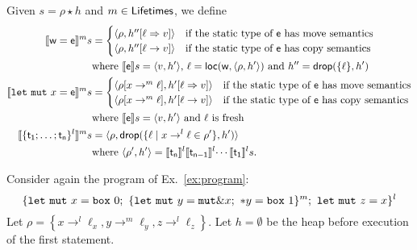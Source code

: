 \begin{definition}\label{def:semantics_terms}
  Given $s=\rho\star h$ and $m\in\Lifetimes$, we define
  \begin{align*}
    \denl[\mathsf{w}=\mathsf{e}]{m}{s}&=
    \begin{cases}
      \langle\rho,h''[\ell\Rightarrow v]\rangle & \text{if the static type of $\mathsf{e}$ has move semantics}\\
      \langle\rho,h''[\ell\to v]\rangle & \text{if the static type of $\mathsf{e}$ has copy semantics}
    \end{cases}\\
    &\text{where $\den[\mathsf{e}]{s}=\langle v,h'\rangle$, $\ell=\loc(\mathsf{w},\langle\rho,h'\rangle)$ and
      $h''=\drop(\{\ell\},h')$}\\
    \denl[\mathtt{let\ mut}\ x=\mathsf{e}]{m}{s}&=
    \begin{cases}
      \langle\rho[x\to^m\ell],h'[\ell\Rightarrow v]\rangle & \text{if the static type of $\mathsf{e}$ has move semantics}\\
      \langle\rho[x\to^m\ell],h'[\ell\to v]\rangle & \text{if the static type of $\mathsf{e}$ has copy semantics}
    \end{cases}\\
    &\text{where $\den[\mathsf{e}]{s}=\langle v,h'\rangle$ and $\ell$ is fresh}\\
    \denl[\{\mathsf{t_1};\ldots;\mathsf{t_n}\}^l]{m}{s}&=\langle\rho,\drop(\{\ell\mid x\to^l\ell\in\rho'\},h')\rangle\\
    &\text{where $\langle\rho',h'\rangle=\denl[\mathsf{t_n}]{l}{\denl[\mathsf{t_{n-1}}]{l}{\cdots\denl[\mathsf{t_1}]{l}{s}}}$.}
  \end{align*}
\end{definition}

\begin{example}
  Consider again the program of Ex.~\ref{ex:program}:
  \[
    \{
      \mathtt{let\ mut}\ x = \mathtt{box}\ 0;\
      \{\mathtt{let\ mut}\ y = \mathtt{mut}\borrow x;\
      \mathtt{*}y = \mathtt{box}\ 1\}^m;\
      \mathtt{let\ mut}\ z = x
    \}^l
  \]
  Let $\rho=\left\{x\rightarrow^l\ell_x,
  y\rightarrow^m\ell_y,
  z\rightarrow^l\ell_z\right\}$.
  Let $h=\emptyset$ be the heap before execution of the first statement.
\end{example}
